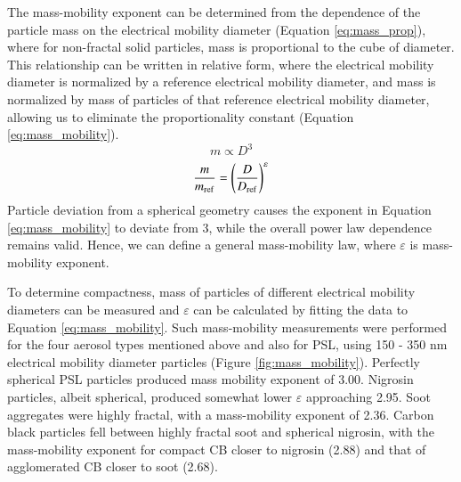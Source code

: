 The mass-mobility exponent can be determined from the dependence of the particle mass on the electrical mobility diameter (Equation \ref{eq:mass_prop}), where for non-fractal solid particles, mass is proportional to the cube of diameter. This relationship can be written in relative form, where the electrical mobility diameter is normalized by a reference electrical mobility diameter, and mass is normalized by mass of particles of that reference electrical mobility diameter, allowing us to eliminate the proportionality constant (Equation \ref{eq:mass_mobility}).
\begin{equation}
    \label{eq:mass_prop}
    m\propto D^3
\end{equation}
\begin{equation}
    \label{eq:mass_mobility}
    \frac{m}{m_{\rm ref}}=\left(\frac{D}{D_{\rm ref}}\right)^\varepsilon
\end{equation}
Particle deviation from a spherical geometry causes the exponent in Equation \ref{eq:mass_mobility} to deviate from 3, while the overall power law dependence remains valid. Hence, we can define a general mass-mobility law, where $\varepsilon$ is mass-mobility exponent.

To determine compactness, mass of particles of different electrical mobility diameters can be measured and $\varepsilon$ can be calculated by fitting the data to Equation \ref{eq:mass_mobility}. Such mass-mobility measurements were performed for the four aerosol types mentioned above and also for PSL, using 150 - 350 nm electrical mobility diameter particles (Figure \ref{fig:mass_mobility}). Perfectly spherical PSL particles produced mass mobility exponent of 3.00. Nigrosin particles, albeit spherical, produced  somewhat lower $\varepsilon$ approaching 2.95. Soot aggregates were highly fractal, with a mass-mobility exponent of 2.36. Carbon black particles fell between highly fractal soot and spherical nigrosin, with the mass-mobility exponent for compact CB closer to nigrosin (2.88) and that of agglomerated CB closer to soot (2.68).

